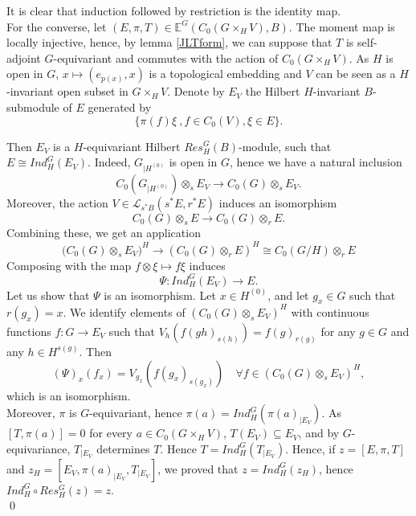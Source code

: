 \begin{dem} It is clear that induction followed by restriction is the identity map.\\ 

For the converse, let $(E,\pi,T)\in \mathbb E^G(C_0(G\times_H V),B)$. The moment map is locally injective, hence, by lemma \ref{JLTform}, we can suppose that $T$ is self-adjoint $G$-equivariant and commutes with the action of $C_0(G\times_H V)$. As $H$ is open in $G$, $x\mapsto (e_{p(x)},x)$ is a topological embedding and $V$ can be seen as a $H$-invariant open subset in $G\times_H V$. Denote by $E_V$ the Hilbert $H$-invariant $B$-submodule of $E$ generated by 
\[\{\pi(f)\xi \ ,f\in C_0(V), \xi\in E\}.\]

Then $E_{V}$ is a $H$-equivariant Hilbert $Res_H^G(B)$-module, such that $E\cong Ind_H^G (E_V)$. Indeed, $G_{|H^{(0)}}$ is open in $G$, hence we have a natural inclusion 
\[C_0(G_{|H^{(0)}})\otimes_s E_V \rightarrow C_0(G)\otimes_s E_V .\] Moreover, the action  $V\in \mathcal L_{s^*B}(s^* E, r^* E)$ induces an isomorphism
\[ C_0(G)\otimes_s E \rightarrow C_0(G)\otimes_r E. \]
Combining these, we get an application 
\[ \Big(C_0(G)\otimes_s E_V\Big)^H \rightarrow (C_0( G)\otimes_r E)^H \cong C_0(G/H)\otimes_r E \]
Composing with the map $f\otimes \xi \mapsto f\xi$ induces
\[\Psi : Ind_H^G (E_V) \rightarrow E.\]
Let us show that $\Psi$ is an isomorphism. Let $x\in H^{(0)}$, and let $g_x \in G$ such that $r(g_x) = x$. We identify elements of $(C_0(G)\otimes_s E_V)^H$ with continuous functions $f : G \rightarrow E_V$ such that $V_h(f(gh)_{s(h)})= f(g)_{r(g)}$ for any $g\in G$ and any $h\in H^{s(g)}$. Then 
\[ (\Psi)_x(f_x) = V_{g_x}\left( f(g_{x})_{s(g_x)} \right)\quad \forall f\in \left( C_0( G)\otimes_s E_V\right)^H, \]
which is an isomorphism. \\ %

Moreover, $\pi$ is $G$-equivariant, hence $\pi(a) = Ind_H^G (\pi(a)_{|E_V} )$. As $[T,\pi(a)]=0$ for every $a\in C_0(G\times_H V)$, $T(E_V)\subseteq E_V$, and by $G$-equivariance, $T_{|E_V}$ determines $T$. Hence $T= Ind_H^G (T_{|E_V})$. Hence, if $z=[E,\pi,T]$ and $z_H =[E_V,\pi(a)_{|E_V},T_{|E_V}]$, we proved that $z = Ind_H^G( z_H)$, hence $Ind_H^G \circ Res_H^G (z)= z$.\\
\qed  
\end{dem}

